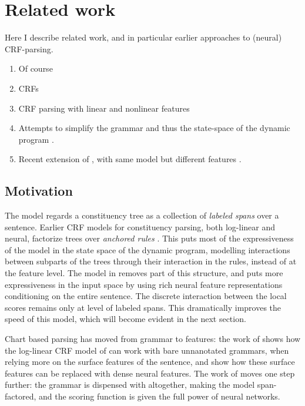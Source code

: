 \section{Related work}
Here I describe related work, and in particular earlier approaches to (neural) CRF-parsing.
\begin{enumerate}
  \item Of course \citep{stern2017minimal}
  \item CRFs \citep{sutton2012crf}
  \item CRF parsing with linear and nonlinear features \citep{finkel2008crf,klein2015crf}
  \item Attempts to simplify the grammar and thus the state-space of the dynamic program \citep{hall2014less}.
  \item Recent extension of \citet{stern2017minimal}, with same model but different features \citep{kitaev2018attentive}.
\end{enumerate}

\subsection{Motivation}
The model regards a constituency tree as a collection of \textit{labeled spans} over a sentence. Earlier CRF models for constituency parsing, both log-linear and neural, factorize trees over \textit{anchored rules} \citep{finkel2008crf,klein2015crf}. This puts most of the expressiveness of the model in the state space of the dynamic program, modelling interactions between subparts of the trees through their interaction in the rules, instead of at the feature level. The model in \citet{stern2017minimal} removes part of this structure, and puts more expressiveness in the input space by using rich neural feature representations conditioning on the entire sentence. The discrete interaction between the local scores remains only at level of labeled spans. This dramatically improves the speed of this model, which will become evident in the next section.

Chart based parsing has moved from grammar to features: the work of \citet{hall2014less} shows how the log-linear CRF model of \cite{finkel2008crf} can work with bare unnanotated grammars, when relying more on the surface features of the sentence, and \citet{klein2015crf} show how these surface features can be replaced with dense neural features. The work of \citep{stern2017minimal} moves one step further: the grammar is dispensed with altogether, making the model span-factored, and the scoring function is given the full power of neural networks.

